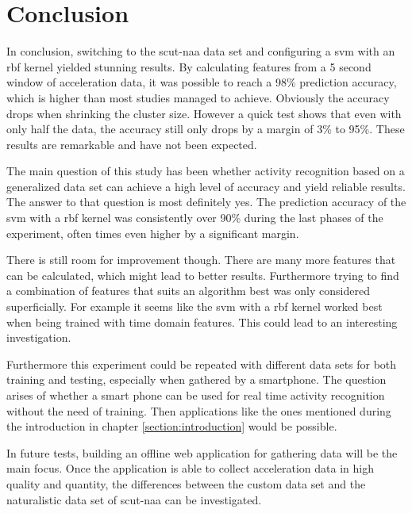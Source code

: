 \section{Conclusion}
\label{section:conclusion}

In conclusion, switching to the \gls{scut-naa} data set and configuring a \gls{svm} with an \gls{rbf} kernel yielded stunning results. By calculating features from a 5 second window of acceleration data, it was possible to reach a 98\% prediction accuracy, which is higher than most studies managed to achieve. Obviously the accuracy drops when shrinking the cluster size. However a quick test shows that even with only half the data, the accuracy still only drops by a margin of 3\% to 95\%. These results are remarkable and have not been expected.

The main question of this study has been whether activity recognition based on a generalized data set can achieve a high level of accuracy and yield reliable results. The answer to that question is most definitely yes. The prediction accuracy of the \gls{svm} with a \gls{rbf} kernel was consistently over 90\% during the last phases of the experiment, often times even higher by a significant margin.

There is still room for improvement though. There are many more features that can be calculated, which might lead to better results. Furthermore trying to find a combination of features that suits an algorithm best was only considered superficially. For example it seems like the \gls{svm} with a \gls{rbf} kernel worked best when being trained with time domain features. This could lead to an interesting investigation.

Furthermore this experiment could be repeated with different data sets for both training and testing, especially when gathered by a smartphone. The question arises of whether a smart phone can be used for real time activity recognition without the need of training. Then applications like the ones mentioned during the introduction in chapter \ref{section:introduction} would be possible.

In future tests, building an offline web application for gathering data will be the main focus. Once the application is able to collect acceleration data in high quality and quantity, the differences between the custom data set and the naturalistic data set of \gls{scut-naa} can be investigated.

\pagebreak